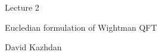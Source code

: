 \def\dbC{{\Bbb C}} 
\def\dbR{{\Bbb R}}

\def\gr#1{{\fam\eufmfam\relax#1}}

\def\grA{{\gr A}}	\def\gra{{\gr a}}
\def\grB{{\gr B}}	\def\grb{{\gr b}}
\def\grC{{\gr C}}	\def\grc{{\gr c}}
\def\grD{{\gr D}}	\def\grd{{\gr d}}
\def\grE{{\gr E}}	\def\gre{{\gr e}}
\def\grF{{\gr F}}	\def\grf{{\gr f}}
\def\grG{{\gr G}}	\def\grg{{\gr g}}
\def\grH{{\gr H}}	\def\grh{{\gr h}}
\def\grI{{\gr I}}	\def\gri{{\gr i}}
\def\grJ{{\gr J}}	\def\grj{{\gr j}}
\def\grK{{\gr K}}	\def\grk{{\gr k}}
\def\grL{{\gr L}}	\def\grl{{\gr l}}
\def\grM{{\gr M}}	\def\grm{{\gr m}}
\def\grN{{\gr N}}	\def\grn{{\gr n}}
\def\grO{{\gr O}}	\def\gro{{\gr o}}
\def\grP{{\gr P}}	\def\grp{{\gr p}}
\def\grQ{{\gr Q}}	\def\grq{{\gr q}}
\def\grR{{\gr R}}	\def\grr{{\gr r}}
\def\grS{{\gr S}}	\def\grs{{\gr s}}
\def\grT{{\gr T}}	\def\grt{{\gr t}}
\def\grU{{\gr U}}	\def\gru{{\gr u}}
\def\grV{{\gr V}}	\def\grv{{\gr v}}
\def\grW{{\gr W}}	\def\grw{{\gr w}}
\def\grX{{\gr X}}	\def\grx{{\gr x}}
\def\grY{{\gr Y}}	\def\gry{{\gr y}}
\def\grZ{{\gr Z}}	\def\grz{{\gr z}}

\def\so{{\frak {so}}}

\def\v{\underline v}

\def\scr#1{{\fam\eusmfam\relax#1}}

\def\scrA{{\scr A}}   \def\scrB{{\scr B}}
\def\scrC{{\scr C}}   \def\scrD{{\scr D}}
\def\scrE{{\scr E}}   \def\scrF{{\scr F}}
\def\scrG{{\scr G}}   \def\scrH{{\scr H}}
\def\scrI{{\scr I}}   \def\scrJ{{\scr J}}
\def\scrK{{\scr K}}   \def\scrL{{\scr L}}
\def\scrM{{\scr M}}   \def\scrN{{\scr N}}
\def\scrO{{\scr O}}   \def\scrP{{\scr P}}
\def\scrQ{{\scr Q}}   \def\scrR{{\scr R}}
\def\scrS{{\scr S}}   \def\scrT{{\scr T}}
\def\scrU{{\scr U}}   \def\scrV{{\scr V}}
\def\scrW{{\scr W}}   \def\scrX{{\scr X}}
\def\scrY{{\scr Y}}   \def\scrZ{{\scr Z}}

\def\gr#1{{\fam\eufmfam\relax#1}}

\def\grg{{\frak g}}
\def\grp{{\frak p}}


\def\spinact{s}
\def\spinel{\tau}

\NoBlackBoxes
\document

\centerline{\bigboldtitlefont Lecture 2}


\centerline{\boldtitlefont Eucledian formulation of Wightman QFT}

\bigskip
\centerline{David Kazhdan}


\dspace
\bigskip\bigskip



